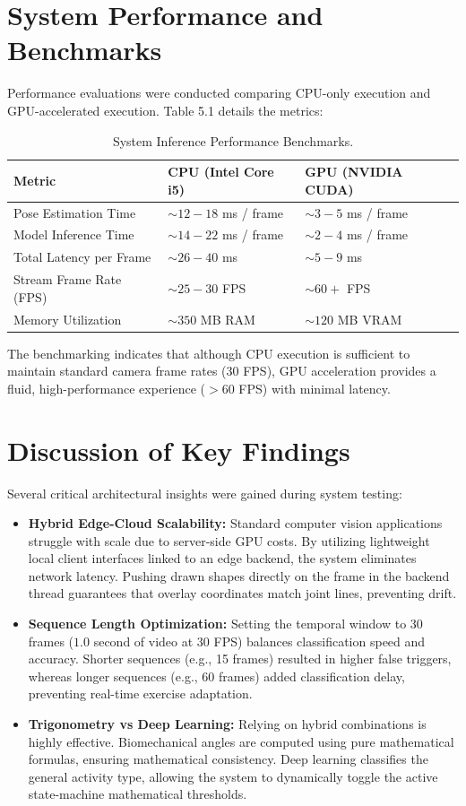 \section{System Performance and Benchmarks}
Performance evaluations were conducted comparing CPU-only execution and GPU-accelerated execution. Table 5.1 details the metrics:

\begin{table}[h]
\centering
\begin{tabular}{|p{4.5cm}|p{5.5cm}|p{5.5cm}|}
\hline
\textbf{Metric} & \textbf{CPU (Intel Core i5)} & \textbf{GPU (NVIDIA CUDA)} \\ \hline
Pose Estimation Time & $\sim 12 - 18$ ms / frame & $\sim 3 - 5$ ms / frame \\ \hline
Model Inference Time & $\sim 14 - 22$ ms / frame & $\sim 2 - 4$ ms / frame \\ \hline
Total Latency per Frame & $\sim 26 - 40$ ms & $\sim 5 - 9$ ms \\ \hline
Stream Frame Rate (FPS) & $\sim 25 - 30$ FPS & $\sim 60+$ FPS \\ \hline
Memory Utilization & $\sim 350$ MB RAM & $\sim 120$ MB VRAM \\ \hline
\end{tabular}
\caption{System Inference Performance Benchmarks.}
\label{tab:performance_benchmarks}
\end{table}

The benchmarking indicates that although CPU execution is sufficient to maintain standard camera frame rates (30 FPS), GPU acceleration provides a fluid, high-performance experience ($>60$ FPS) with minimal latency.

\section{Discussion of Key Findings}
Several critical architectural insights were gained during system testing:
\begin{itemize}
    \item \textbf{Hybrid Edge-Cloud Scalability:} Standard computer vision applications struggle with scale due to server-side GPU costs. By utilizing lightweight local client interfaces linked to an edge backend, the system eliminates network latency. Pushing drawn shapes directly on the frame in the backend thread guarantees that overlay coordinates match joint lines, preventing drift.
    \item \textbf{Sequence Length Optimization:} Setting the temporal window to 30 frames ($1.0$ second of video at 30 FPS) balances classification speed and accuracy. Shorter sequences (e.g., 15 frames) resulted in higher false triggers, whereas longer sequences (e.g., 60 frames) added classification delay, preventing real-time exercise adaptation.
    \item \textbf{Trigonometry vs Deep Learning:} Relying on hybrid combinations is highly effective. Biomechanical angles are computed using pure mathematical formulas, ensuring mathematical consistency. Deep learning classifies the general activity type, allowing the system to dynamically toggle the active state-machine mathematical thresholds.
\end{itemize}
\newpage
